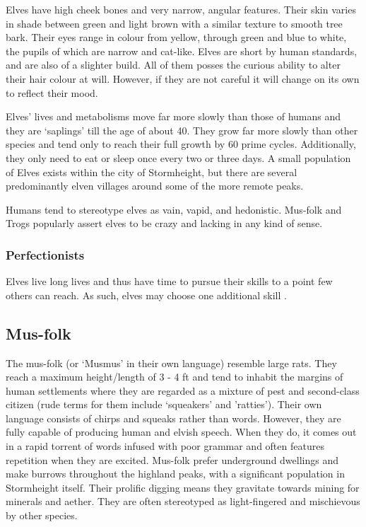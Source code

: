 \documentclass[a4paper,11pt,oneside]{book}
\newcommand{\textlf}[1]{\textbf{\titlecap{#1}}}
\begin{document}
Elves have high cheek bones and very narrow, angular features. Their skin varies in shade between green and light brown with a similar texture to smooth tree bark. Their eyes range in colour from yellow, through green and blue to white, the pupils of which are narrow and cat-like. Elves are short by human standards, and are also of a slighter build. All of them posses the curious ability to alter their hair colour at will. However, if they are not careful it will change on its own to reflect their mood. 

Elves' lives and metabolisms move far more slowly than those of humans and they are `saplings' till the age of about 40. They grow far more slowly than other species and tend only to reach their full growth by 60 prime cycles. Additionally, they only need to eat or sleep once every two or three days. A small population of Elves exists within the city of Stormheight, but there are several predominantly elven villages around some of the more remote peaks. 

Humans tend to stereotype elves as vain, vapid, and hedonistic. Mus-folk and Trogs popularly assert elves to be crazy and lacking in any kind of sense. 

\subsubsection*{Perfectionists}
Elves live long lives and thus have time to pursue their skills to a point few others can reach. As such, elves may choose one additional skill \textlf{proficiency}.


\subsection{Mus-folk}
The mus-folk (or `Musmus' in their own language) resemble large rats. They reach a maximum height/length of 3 - 4 ft and tend to inhabit the margins of human settlements where they are regarded as a mixture of pest and second-class citizen (rude terms for them include `squeakers' and 'ratties'). Their own language consists of chirps and squeaks rather than words. However, they are fully capable of producing human and elvish speech. When they do, it comes out in a rapid torrent of words infused with poor grammar and often features repetition when they are excited. Mus-folk prefer underground dwellings and make burrows throughout the highland peaks, with a significant population in Stormheight itself. Their prolific digging means they gravitate towards mining for minerals and aether. They are often stereotyped as light-fingered and mischievous by other species.  
\end{document}
